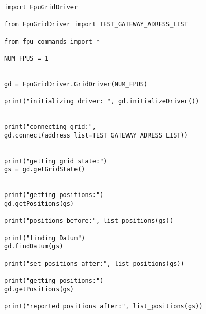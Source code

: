 \documentclass{article}
\begin{document}
\begin{verbatim}
import FpuGridDriver

from FpuGridDriver import TEST_GATEWAY_ADRESS_LIST

from fpu_commands import *

NUM_FPUS = 1


gd = FpuGridDriver.GridDriver(NUM_FPUS)

print("initializing driver: ", gd.initializeDriver())


print("connecting grid:", gd.connect(address_list=TEST_GATEWAY_ADRESS_LIST))


print("getting grid state:")
gs = gd.getGridState()


print("getting positions:")
gd.getPositions(gs)

print("positions before:", list_positions(gs))

print("finding Datum")
gd.findDatum(gs)

print("set positions after:", list_positions(gs))

print("getting positions:")
gd.getPositions(gs)

print("reported positions after:", list_positions(gs))
\end{verbatim}
\end{document}

